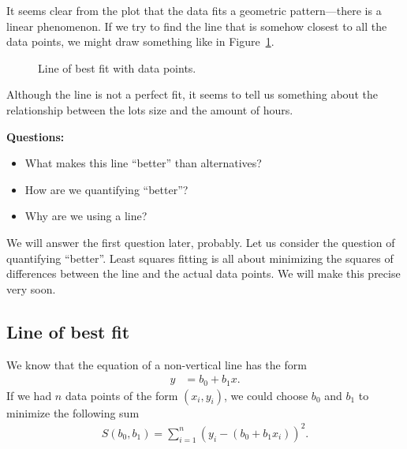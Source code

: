\documentclass[a4paper, 12pt]{article}
\numberwithin{equation}{section}
\numberwithin{figure}{section}
\theoremstyle{definition}
\begin{document}
It seems clear from the plot that the data fits a geometric pattern---there is a
linear phenomenon. If we try to find the line that is somehow closest to all the
data points, we might draw something like in Figure~\ref{fig:2d-linear-data-line}. 

\begin{figure}[h] 
	\centering
	\caption{Line of best fit with data points.}
	\label{fig:2d-linear-data-line}
\end{figure}

Although the line is not a perfect fit, it seems to tell us something about the
relationship between the lots size and the amount of hours. 

\textbf{Questions:}
\begin{itemize}
	\item What makes this line ``better'' than alternatives?
	\item How are we quantifying ``better''? 
	\item Why are we using a line? 
\end{itemize}
We will answer the first question later, probably. Let us consider the question
of quantifying ``better''. Least squares fitting is all about minimizing the
squares of differences between the line and the actual data points. We will make
this precise very soon.

\subsection{Line of best fit}

We know that the equation of a non-vertical line has the form 
\begin{align*}
	y &= b_0 + b_1x.
\end{align*}
If we had $n$ data points of the form $(x_i,y_i)$, we could choose $b_0$ and
$b_1$ to minimize the following sum
\begin{align*}
	S(b_0,b_1) = \sum_{i=1}^n \left(y_i - (b_0 + b_1x_i)\right)^2 .
\end{align*}
\end{document}
